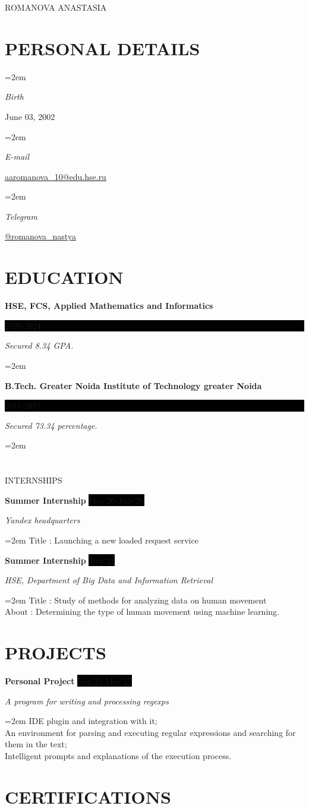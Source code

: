 \documentclass[paper=a4,fontsize=11pt]{scrartcl} %
\newlength{\spacebox}
\newcommand{\sepspace}{\vspace*{1em}}		%
\newcommand{\MyName}[1]{ %
		\Huge \usefont{OT1}{phv}{b}{n} \hfill #1
		\par \normalsize \normalfont}
\newcommand{\MySlogan}[1]{ %
		\large \usefont{OT1}{phv}{m}{n}\hfill \textit{#1}
		\par \normalsize \normalfont}
\newcommand{\NewPart}[1]{\section*{\uppercase{#1}}}
\newcommand{\PersonalEntry}[2]{
		\noindent\hangindent=2em\hangafter=0 %
		\parbox{\spacebox}{        %
		\textit{#1}}		       %
		\hspace{1.5em} #2 \par}    %
\newcommand{\EducationEntry}[4]{
		\noindent \textbf{#1} \hfill      %
		\colorbox{Black}{%
			\parbox{6em}{%
			\hfill\color{White}#2}} \par  %
		\noindent \textit{#3} \par        %
		\noindent\hangindent=2em\hangafter=0 \small #4 %
		\normalsize \par}
\newcommand{\WorkEntry}[4]{				  %
		\noindent \textbf{#1} \hfill      %
		\colorbox{Black}{\color{White}#2} \par  %
		\noindent \textit{#3} \par              %
		\noindent\hangindent=2em\hangafter=0 \small #4 %
		\normalsize \par}
\begin{document}

\MyName{ROMANOVA ANASTASIA}

\sepspace

\NewPart{Personal details}{}

\PersonalEntry{Birth}{June 03, 2002}
\PersonalEntry{E-mail}{\url{aaromanova_10@edu.hse.ru}}
\PersonalEntry{Telegram}{\url{@romanova_nastya}}

\NewPart{Education}{}

\EducationEntry{HSE, FCS, Applied Mathematics and Informatics}{2020-2024}{Secured 8.34 GPA.}

\sepspace

\EducationEntry{B.Tech. Greater Noida Institute of Technology greater Noida}{2011-2015}{Secured 73.34 percentage.}


\NewPart{INTERNSHIPS}{}

\WorkEntry{Summer Internship}{May'20-July'20}{Yandex headquarters}{Title : Launching a new loaded request service}
\sepspace

\WorkEntry{Summer Internship}{July'21}{HSE, Department of Big Data and Information Retrieval}{Title : Study of methods for analyzing data on human movement \\ About : Determining the type of human movement using machine learning.}

\NewPart{Projects}{}

\WorkEntry{Personal Project}{Nov'21-May'21}{A program for writing and processing regexps}{IDE plugin and integration with it; \\
An environment for parsing and executing regular expressions and searching for them in the text; \\
Intelligent prompts and explanations of the execution process.}

\NewPart{Certifications}{}
\end{document}
